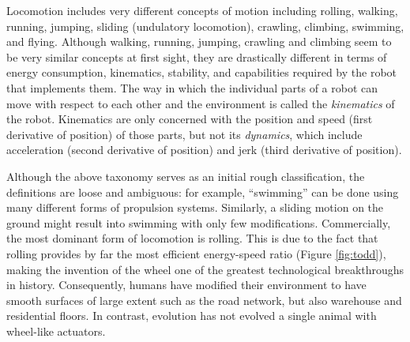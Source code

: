 Locomotion includes very different concepts of motion including rolling, walking, running, jumping, sliding (undulatory locomotion), crawling, climbing, swimming, and flying. Although walking, running, jumping, crawling and climbing seem to be very similar concepts at first sight, they are drastically different in terms of energy consumption, kinematics, stability, and capabilities required by the robot that implements them. The way in which the individual parts of a robot can move with respect to each other and the environment is called the \emph{kinematics} of the robot. Kinematics are only concerned with the position and speed (first derivative of position) of those parts, but not its \emph{dynamics}, which include acceleration (second derivative of position) and jerk (third derivative of position).
%

Although the above taxonomy serves as an initial rough classification, the definitions are loose and ambiguous: for example, ``swimming'' can be done using many different forms of propulsion systems. Similarly, a sliding motion on the ground might result into swimming with only few modifications. Commercially, the most dominant form of locomotion is rolling. This is due to the fact that rolling provides by far the most efficient energy-speed ratio (Figure \ref{fig:todd}), making the invention of the wheel one of the greatest technological breakthroughs in history. Consequently, humans have modified their environment to have smooth surfaces of large extent such as the road network, but also warehouse and residential floors. In contrast, evolution has not evolved a single animal with wheel-like actuators.

